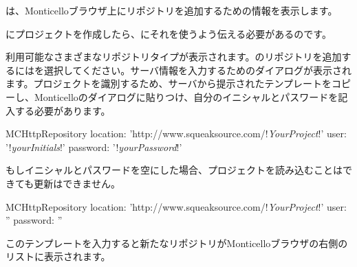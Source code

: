 \documentclass[a4paper,10pt,twoside]{book}
\begin{document}
\sqsrc は、Monticelloブラウザ上にリポジトリを追加するための情報を表示します。

\sqsrc にプロジェクトを作成したら、\pharo にそれを使うよう伝える必要があるのです。

利用可能なさまざまなリポジトリタイプが表示されます。\sqsrc のリポジトリを追加するにはを選択してください。サーバ情報を入力するためのダイアログが表示されます。\sqsrc プロジェクトを識別するため、サーバから提示されたテンプレートをコピーし、Monticelloのダイアログに貼りつけ、自分のイニシャルとパスワードを記入する必要があります。

\begin{code}{}
MCHttpRepository
    location: 'http://www.squeaksource.com/!\emph{YourProject}!'
    user: '!\emph{yourInitials}!'
    password: '!\emph{yourPassword}!'
\end{code}

\noindent
もしイニシャルとパスワードを空にした場合、プロジェクトを読み込むことはできても更新はできません。

\begin{code}{}
MCHttpRepository
    location: 'http://www.squeaksource.com/!\emph{YourProject}!'
    user: ''
    password: ''
\end{code}

このテンプレートを入力すると新たなリポジトリがMonticelloブラウザの右側のリストに表示されます。
\end{document}
